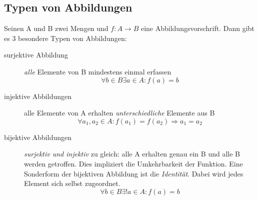 \subsection{Typen von Abbildungen}
Seinen A und B zwei Mengen und $f:{A}\longrightarrow{B}$ eine Abbildungsvorschrift.
Dann gibt es 3 besondere Typen von Abbildungen:

\begin{description}
\item[surjektive Abbildung] \emph{alle} Elemente von B mindestens einmal erfassen
$$ \forall b \in B \exists a \in A : f(a)=b $$
\item[injektive Abbildungen] alle Elemente von A erhalten \emph{unterschiedliche} Elemente aus B
$$ \forall a_1,a_2  \in A : f(a_1)=f(a_2) \Rightarrow a_1 = a_2 $$
\item[bijektive Abbildungen] \emph{surjektiv und injektiv} zu gleich: alle A erhalten genau ein B und alle B werden getroffen.
Dies impliziert die Umkehrbarkeit der Funktion. Eine Sonderform der bijektiven
Abbildung ist die \emph{Identität}. Dabei wird jedes Element sich selbst zugeordnet.
$$ \forall b \in B \exists ! a \in A : f(a) = b $$
\end{description}

\begin{figure}
\hfill
{}\hfill
{}\hfill
{}
\end{figure}